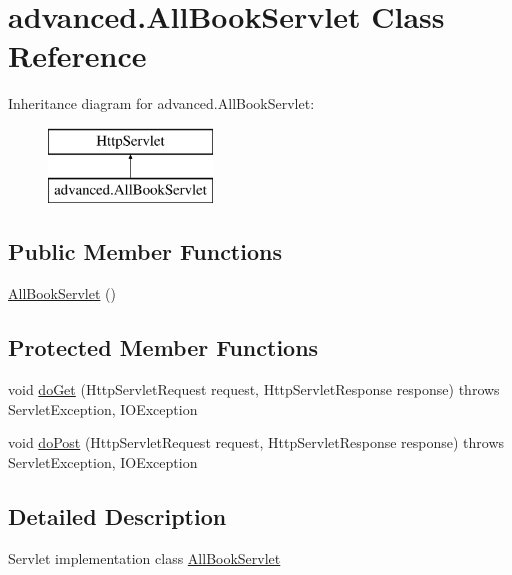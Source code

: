 \hypertarget{classadvanced_1_1_all_book_servlet}{}\section{advanced.\+All\+Book\+Servlet Class Reference}
\label{classadvanced_1_1_all_book_servlet}
Inheritance diagram for advanced.\+All\+Book\+Servlet\+:\begin{figure}[H]
\begin{center}
\leavevmode
\includegraphics[height=2.000000cm]{classadvanced_1_1_all_book_servlet}
\end{center}
\end{figure}
\subsection*{Public Member Functions}
\begin{DoxyCompactItemize}
\item 
\hyperlink{classadvanced_1_1_all_book_servlet_a37d738fd86cfcf6b73a81044253d0465}{All\+Book\+Servlet} ()
\end{DoxyCompactItemize}
\subsection*{Protected Member Functions}
\begin{DoxyCompactItemize}
\item 
void \hyperlink{classadvanced_1_1_all_book_servlet_a254894253935322173402de169c7d647}{do\+Get} (Http\+Servlet\+Request request, Http\+Servlet\+Response response)  throws Servlet\+Exception, I\+O\+Exception 
\item 
void \hyperlink{classadvanced_1_1_all_book_servlet_a8a5a865de4a130dc91e8354b1a4887ca}{do\+Post} (Http\+Servlet\+Request request, Http\+Servlet\+Response response)  throws Servlet\+Exception, I\+O\+Exception 
\end{DoxyCompactItemize}


\subsection{Detailed Description}
Servlet implementation class \hyperlink{classadvanced_1_1_all_book_servlet}{All\+Book\+Servlet} 

